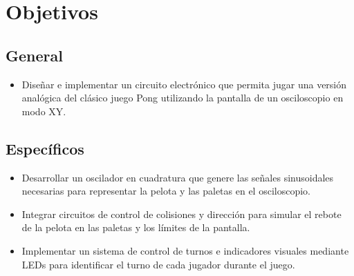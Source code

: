 \section{Objetivos}
\subsection{General}
\begin{itemize}
    \item Diseñar e implementar un circuito electrónico que permita jugar una versión analógica del clásico juego Pong utilizando la pantalla de un osciloscopio en modo XY.
\end{itemize}
\subsection{Específicos}
\begin{itemize}
    \item Desarrollar un oscilador en cuadratura que genere las señales sinusoidales necesarias para representar la pelota y las paletas en el osciloscopio.
    \item Integrar circuitos de control de colisiones y dirección para simular el rebote de la pelota en las paletas y los límites de la pantalla.
    \item Implementar un sistema de control de turnos e indicadores visuales mediante LEDs para identificar el turno de cada jugador durante el juego.
\end{itemize}